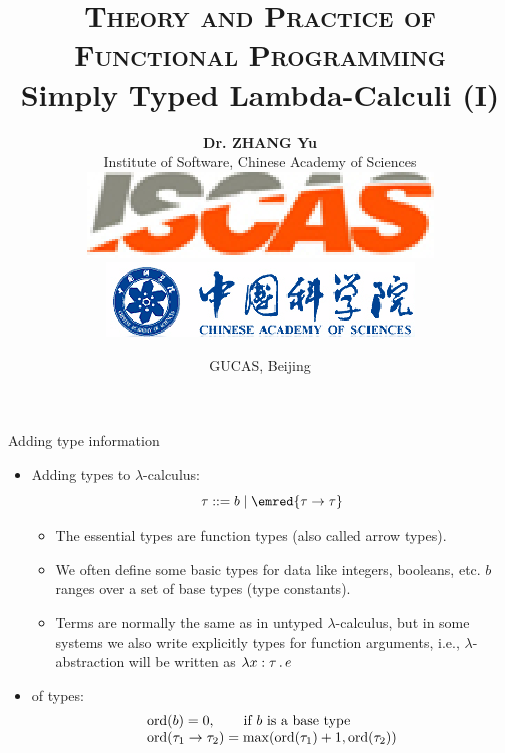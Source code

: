 \documentclass[paper=screen,mode=present,style=zysimple]{powerdot}
\title{{\small \textsc{Theory and Practice of Functional Programming}}
\\[12pt]
{\Large \color{TitleColor} Simply Typed Lambda-Calculi (I)}
}
\author{\small \textbf{Dr. ZHANG Yu}
  \\[2pt] \small Institute of Software, Chinese Academy of Sciences 
  \\[5pt] \includegraphics[height=.04\slideheight]{iscas.eps} 
  \qquad \qquad 
  \includegraphics[height=.04\slideheight]{cas.eps}
}
\date{\scriptsize GUCAS, Beijing}
\begin{document}
\maketitle 

\begin{slide}{Adding type information}
\begin{itemize}
\item Adding types to $\lambda$-calculus:
\[
\tau ::= b \mid \emred{\tau \to \tau}
\]
\begin{itemize}
\item The essential types are function types (also called arrow types). 
\item We often define some basic types for data like integers, booleans, etc. 
  $b$ ranges over a set of base types (type constants). 
\item Terms are normally the same as in untyped $\lambda$-calculus, but in some systems we also 
  write explicitly types for function arguments, i.e., $\lambda$-abstraction will be written as 
  $ \lambda x : \tau \, . \, e$
\end{itemize}
\item {} of types:
\[
\begin{array}{l}
\mathrm{ord}(b) = 0 , \qquad \mbox{if $b$ is a base type} \\
\mathrm{ord}(\tau_1 \to \tau_2) = \max(\mathrm{ord}(\tau_1)+1, \mathrm{ord}(\tau_2))
\end{array}
\]
\end{itemize}
\end{slide}
\end{document}
